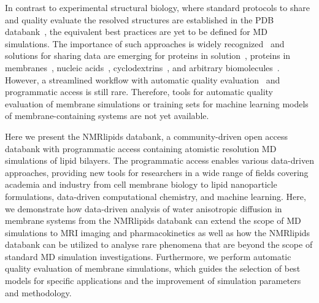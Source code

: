 \documentclass[fleqn,10pt]{wlscirep}
\begin{document}
In contrast to experimental structural biology, where standard protocols to share and quality evaluate the resolved structures are established in the PDB databank~\cite{montelione13}, the equivalent best practices are yet to be defined for MD simulations. The importance of such approaches is widely recognized~\cite{feig99,tai04,silva06,abraham19,hildebrand19,hospital20,abriata20,espigares20} and solutions for sharing data are emerging for proteins in solution~\cite{meyer10,kamp10}, proteins in membranes~\cite{newport19,espigares20,leston22}, nucleic acids~\cite{hospital16}, cyclodextrins~\cite{mixcoha16}, and arbitrary biomolecules~\cite{bekker20}. However,
a streamlined workflow with automatic quality evaluation~\cite{meyer10,hospital16} and programmatic access is still rare. 
Therefore, tools for automatic quality evaluation of membrane simulations or training sets for machine learning models of membrane-containing systems are not yet available. 



Here we present the NMRlipids databank, a community-driven open access databank with programmatic access containing atomistic resolution MD simulations of lipid bilayers. The programmatic access enables various data-driven approaches, providing new tools for researchers in a wide range of fields covering academia and industry from cell membrane biology to lipid nanoparticle formulations, data-driven computational chemistry, and machine learning. Here, we demonstrate how data-driven analysis of water anisotropic diffusion in membrane systems from the NMRlipids databank can extend the scope of MD simulations to MRI imaging and pharmacokinetics as well as how the NMRlipids databank can be utilized to analyse rare phenomena that are beyond the scope of standard MD simulation investigations. Furthermore, we perform automatic quality evaluation of membrane simulations, which guides the selection of best models for specific applications and the improvement of simulation parameters and methodology.
\end{document}
